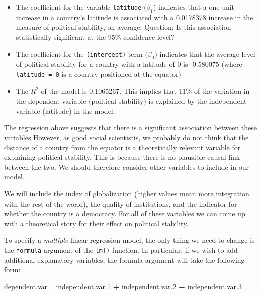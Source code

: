 \documentclass[]{article}
\newenvironment{Shaded}{\begin{snugshade}}{\end{snugshade}}
\newcommand{\FloatTok}[1]{\textcolor[rgb]{0.00,0.00,0.81}{#1}}
\newcommand{\NormalTok}[1]{#1}
\newcommand{\OperatorTok}[1]{\textcolor[rgb]{0.81,0.36,0.00}{\textbf{#1}}}
\newcommand{\StringTok}[1]{\textcolor[rgb]{0.31,0.60,0.02}{#1}}
\providecommand{\tightlist}{%
  \setlength{\itemsep}{0pt}\setlength{\parskip}{0pt}}
\begin{document}
\begin{itemize}
\tightlist
\item
  The coefficient for the variable \texttt{latitude} (\(\beta_1\)) indicates that a one-unit increase in a country's latitude is associated with a 0.0178378 increase in the measure of political stability, on average. Question: Is this association statistically significant at the 95\% confidence level?
\item
  The coefficient for the \texttt{(intercept)} term (\(\beta_0\)) indicates that the average level of political stability for a country with a latitude of 0 is -0.580075 (where \texttt{latitude\ =\ 0} is a country positioned at the equator)
\item
  The \(R^2\) of the model is 0.1065267. This implies that 11\% of the variation in the dependent variable (political stability) is explained by the independent variable (latitude) in the model.
\end{itemize}

The regression above suggests that there is a significant association between these variables However, as good social scientistis, we probably do not think that the distance of a country from the equator is a theoretically relevant variable for explaining political stability. This is because there is no plausible causal link between the two. We should therefore consider other variables to include in our model.

We will include the index of globalization (higher values mean more integration with the rest of the world), the quality of institutions, and the indicator for whether the country is a democracy. For all of these variables we can come up with a theoretical story for their effect on political stability.

To specify a \emph{multiple} linear regression model, the only thing we need to change is the \texttt{formula} argument of the \texttt{lm()} function. In particular, if we wish to add additional explanatory variables, the formula argument will take the following form:

\begin{Shaded}
\begin{Highlighting}[]
\NormalTok{dependent.var }\OperatorTok{~}\StringTok{ }\NormalTok{independent.var}\FloatTok{.1} \OperatorTok{+}\StringTok{ }\NormalTok{independent.var}\FloatTok{.2} \OperatorTok{+}\StringTok{ }\NormalTok{independent.var}\FloatTok{.3}\NormalTok{ ...}
\end{Highlighting}
\end{Shaded}
\end{document}
